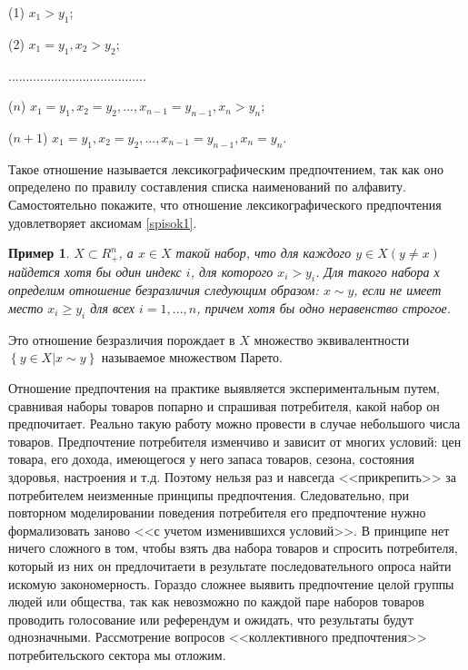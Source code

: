 \documentclass[12pt, 4paper]{book}
\newtheorem{example}{\indent \color{blue} Пример}[chapter]
\begin{document}
{\begin{center}
(1) $x_{1} > y_{1}$;
\end{center}
\begin{center}
(2) $x_{1} = y_{1}, x_{2} > y_{2}$;
\end{center}
\begin{center}
.......................................
\end{center}
\begin{center}
($n$) $x_{1} = y_{1}, x_{2} = y_{2},...,x_{n-1} = y_{n-1}, x_{n} > y_{n}$; 
\end{center}
\begin{center}
($n+1$) $x_{1} = y_{1}, x_{2} = y_{2},...,x_{n-1} = y_{n-1}, x_{n} = y_{n}$.
\end{center}
Такое отношение называется лексикографическим предпочтением, так как оно определено по правилу составления списка наименований по алфавиту. Самостоятельно покажите, что отношение лексикографического предпочтения удовлетворяет аксиомам \ref{spisok1}.
\begin{example}
\label{exam2.2}
 $X \subset R_{+}^{n}$, а $x \in X$ такой набор, что для каждого $y \in X (y\neq x)$ найдется хотя бы один индекс $i$, для которого $x_{i} > y_{i}$. Для такого набора х определим отношение безразличия следующим образом: $x \sim y$, если не имеет место $x_{i} \geq y_{i}$ для всех $i = 1,...,n$,	причем хотя бы одно неравенство строгое.
\end{example}

Это отношение безразличия порождает в $X$ множество эквивалентности $\left\{y\in X | x\sim y \right\}$ называемое множеством Парето.

Отношение предпочтения на практике выявляется экспериментальным путем, сравнивая наборы товаров попарно и спрашивая потребителя, какой набор он предпочитает. Реально такую работу можно провести в случае небольшого числа товаров. Предпочтение потребителя изменчиво и зависит от многих условий: цен товара, его дохода, имеющегося у него запаса товаров, сезона, состояния здоровья, настроения и т.д. Поэтому нельзя раз и навсегда <<прикрепить>> за потребителем неизменные принципы предпочтения. Следовательно, при повторном моделировании поведения потребителя его предпочтение нужно формализовать заново <<с учетом изменившихся условий>>. В принципе нет ничего сложного в том, чтобы взять два набора товаров и спросить потребителя, который из них он предлочитаети в результате последовательного опроса найти искомую закономерность. Гораздо сложнее выявить предпочтение целой группы людей или общества, так как невозможно по каждой паре наборов товаров проводить голосование или референдум и ожидать, что результаты будут однозначными. Рассмотрение вопросов <<коллективного предпочтения>> потребительского сектора мы отложим.

}
\end{document}
